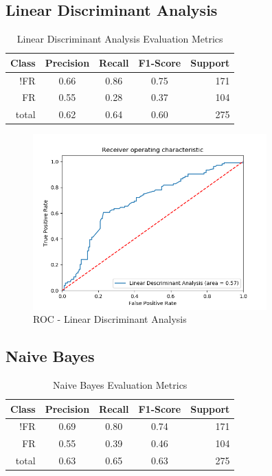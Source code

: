 \documentclass{article}
\begin{document}
\subsection{Linear Discriminant Analysis}

\begin{table}[!htb]
\setlength\tabcolsep{0pt} %
\footnotesize\centering
\smallskip 
\begin{tabular*}{\columnwidth}{@{\extracolsep{\fill}}rcccr}
\toprule
  Class&Precision&Recall&F1-Score&Support \\
\midrule
  !FR  & 0.66&0.86&0.75&171\\
  FR & 0.55&0.28&0.37&104 \\
  \midrule
total&0.62&0.64&0.60&275\\
\bottomrule
\end{tabular*}
\caption{Linear Discriminant Analysis Evaluation Metrics} \label{tab:lda}
\end{table}

\begin{figure}[h]
\includegraphics[width=9cm]{images/roc-lda.png}
\caption{ROC - Linear Discriminant Analysis}\label{fig:lda}
\centering
\end{figure}

\subsection{Naive Bayes}
\begin{table}[!htb]
\setlength\tabcolsep{0pt} %
\footnotesize\centering
\smallskip 
\begin{tabular*}{\columnwidth}{@{\extracolsep{\fill}}rcccr}
\toprule
  Class&Precision&Recall&F1-Score&Support \\
\midrule
  !FR  & 0.69&0.80&0.74&171\\
  FR & 0.55&0.39&0.46&104 \\
  \midrule
total&0.63&0.65&0.63&275\\
\bottomrule
\end{tabular*}
\caption{Naive Bayes Evaluation Metrics} \label{tab:nb}
\end{table}
\end{document}

